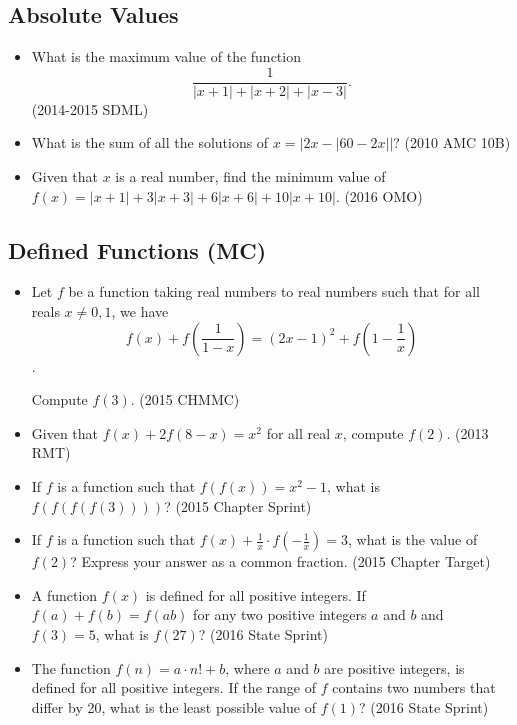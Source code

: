 \documentclass{article}
\begin{document}
\subsection{Absolute Values}

\begin{itemize}

\item What is the maximum value of the function $$\frac{1}{|x+1|+|x+2|+|x-3|}.$$ (2014-2015 SDML)

\item What is the sum of all the solutions of $x = \left|2x-|60-2x|\right|$? (2010 AMC 10B)

\item Given that $x$ is a real number, find the minimum value of $f(x)=|x+1|+3|x+3|+6|x+6|+10|x+10|$. (2016 OMO)


\end{itemize}

\subsection{Defined Functions (MC)}

\begin{itemize}

\item Let $f$ be a function taking real numbers to real numbers such that for all reals $x\neq 0,1$, we have $$f(x)+f(\frac{1}{1-x})=(2x-1)^2+f(1-\frac{1}{x})$$.

Compute $f(3)$. (2015 CHMMC)

\item Given that $f(x) + 2f(8 - x) = x^2$
for all real $x$, compute $f(2)$. (2013 RMT)

\item If $f$ is a function such that $f(f(x))=x^2-1$, what is $f(f(f(f(3))))$? (2015 Chapter Sprint)

\item If $f$ is a function such that $f(x)+\frac{1}{x}\cdot f(-\frac{1}{x})=3$, what is the value of $f(2)$? Express your answer as a common fraction. (2015 Chapter Target)

\item A function $f(x)$ is defined for all positive integers. If $f(a)+f(b)=f(ab)$ for any two positive integers $a$ and $b$ and $f(3)=5$, what is $f(27)$? (2016 State Sprint)

\item The function $f(n)=a\cdot n!+b$, where $a$ and $b$ are positive integers, is defined for all positive integers. If the range of $f$ contains two numbers that differ by 20, what is the least possible value of $f(1)$? (2016 State Sprint)

\end{itemize}
\end{document}
